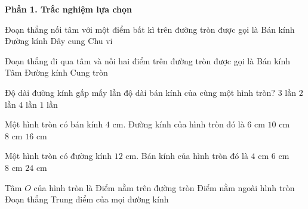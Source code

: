 \textbf{Phần 1. Trắc nghiệm lựa chọn}

\begin{ex} %
Đoạn thẳng nối tâm với một điểm bất kì trên đường tròn được gọi là
\choice
{\True Bán kính}
{Đường kính}
{Dây cung}
{Chu vi}
\end{ex}

\begin{ex} %
Đoạn thẳng đi qua tâm và nối hai điểm trên đường tròn được gọi là
\choice
{Bán kính}
{Tâm}
{\True Đường kính}
{Cung tròn}
\end{ex}

\begin{ex} %
Độ dài đường kính gấp mấy lần độ dài bán kính của cùng một hình tròn?
\choice
{$3$ lần}
{\True $2$ lần}
{$4$ lần}
{$1$ lần}
\end{ex}

\begin{ex} %
Một hình tròn có bán kính $4\text{ cm}$. Đường kính của hình tròn đó là
\choice
{$6\text{ cm}$}
{$10\text{ cm}$}
{\True $8\text{ cm}$}
{$16\text{ cm}$}
\end{ex}

\begin{ex} %
Một hình tròn có đường kính $12\text{ cm}$. Bán kính của hình tròn đó là
\choice
{$4\text{ cm}$}
{\True $6\text{ cm}$}
{$8\text{ cm}$}
{$24\text{ cm}$}
\end{ex}

\begin{ex} %
Tâm $O$ của hình tròn là
\choice
{Điểm nằm trên đường tròn}
{Điểm nằm ngoài hình tròn}
{Đoạn thẳng}
{\True Trung điểm của mọi đường kính}
\end{ex}

